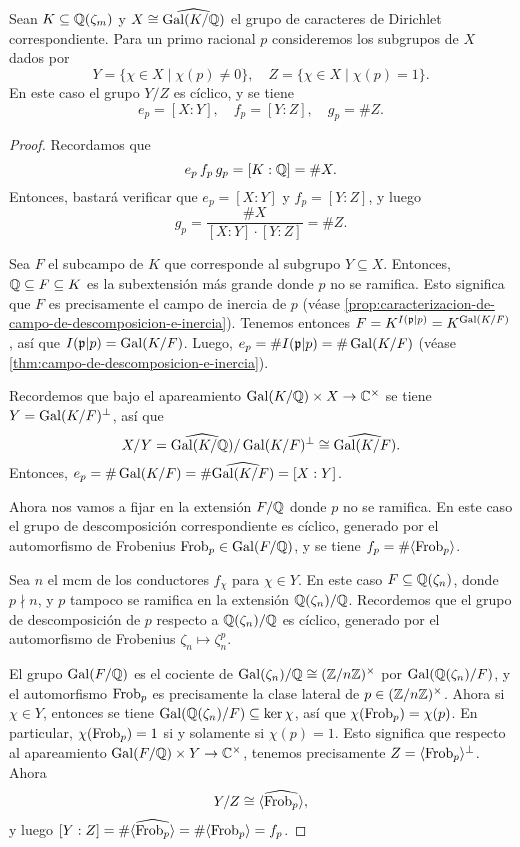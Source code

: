 \begin{teorema}
  \label{thm:caracteres-de-Dirichlet-descomposicion-e-inercia}
  Sean $K \subseteq \mathbb{Q} (\zeta_m)$ y $X \cong \widehat{\operatorname{Gal} (K/\mathbb{Q})}$ el grupo
  de caracteres de Dirichlet correspondiente. Para un primo racional $p$
  consideremos los subgrupos de $X$ dados por
  \[ Y = \{ \chi\in X \mid \chi (p) \ne 0 \}, \quad
     Z = \{ \chi\in X\mid \chi (p) = 1 \}. \]
  En este caso el grupo $Y/Z$ es cíclico, y se tiene
  \[ e_p = [X:Y], \quad
     f_p = [Y:Z], \quad
     g_p = \# Z. \]
  \begin{proof}
    Recordamos que
    $$e_p\,f_p\,g_p = [K : \mathbb{Q}] = \# X.$$
    Entonces, bastará verificar que $e_p = [X:Y]$ y $f_p = [Y:Z]$, y luego
    $$g_p = \frac{\# X}{[X:Y]\cdot [Y:Z]} = \# Z.$$

    Sea $F$ el subcampo de $K$ que corresponde al subgrupo
    $Y \subseteq X$. Entonces, $\mathbb{Q} \subseteq F \subseteq K$ es la subextensión
    más grande donde $p$ no se ramifica. Esto significa que $F$ es precisamente
    el campo de inercia de $p$ (véase
    \ref{prop:caracterizacion-de-campo-de-descomposicion-e-inercia}). Tenemos
    entonces $F = K^{I (\mathfrak{p}|p)} = K^{\operatorname{Gal} (K/F)}$, así que
    $I (\mathfrak{p}|p) = \operatorname{Gal} (K/F)$. Luego,
    $e_p = \# I (\mathfrak{p}|p) = \# \operatorname{Gal} (K/F)$ (véase
    \ref{thm:campo-de-descomposicion-e-inercia}).

    Recordemos que bajo el apareamiento $\operatorname{Gal} (K/\mathbb{Q}) \times X \to \mathbb{C}^\times$
    se tiene $Y = \operatorname{Gal} (K/F)^\perp$, así que
    \[ X/Y = \widehat{\operatorname{Gal} (K/\mathbb{Q})}/\operatorname{Gal} (K/F)^\perp \cong \widehat{\operatorname{Gal} (K/F)}. \]
    Entonces, $e_p = \# \operatorname{Gal} (K/F) = \# \widehat{\operatorname{Gal} (K/F)} = [X : Y]$.

    Ahora nos vamos a fijar en la extensión $F/\mathbb{Q}$ donde $p$ no se ramifica.
    En este caso el grupo de descomposición correspondiente es cíclico, generado
    por el automorfismo de Frobenius $\operatorname{Frob}_p \in \operatorname{Gal} (F/\mathbb{Q})$, y se tiene
    $f_p = \# \langle \operatorname{Frob}_p\rangle$.

    Sea $n$ el mcm de los conductores $f_\chi$ para $\chi \in Y$. En este caso
    $F \subseteq \mathbb{Q} (\zeta_n)$, donde $p \nmid n$, y $p$ tampoco se
    ramifica en la extensión $\mathbb{Q} (\zeta_n)/\mathbb{Q}$. Recordemos que el grupo de
    descomposición de $p$ respecto a $\mathbb{Q} (\zeta_n)/\mathbb{Q}$ es cíclico, generado
    por el automorfismo de Frobenius $\zeta_n \mapsto \zeta_n^p$.

    El grupo $\operatorname{Gal} (F/\mathbb{Q})$ es el cociente de
    $\operatorname{Gal} (\zeta_n)/\mathbb{Q} \cong (\mathbb{Z}/n\mathbb{Z})^\times$ por
    $\operatorname{Gal} (\mathbb{Q} (\zeta_n)/F)$, y el automorfismo $\operatorname{Frob}_p$ es precisamente
    la clase lateral de $p \in (\mathbb{Z}/n\mathbb{Z})^\times$. Ahora si $\chi \in Y$,
    entonces se tiene $\operatorname{Gal} (\mathbb{Q} (\zeta_n)/F) \subseteq \ker \chi$, así que
    $\chi (\operatorname{Frob}_p) = \chi (p)$. En particular, $\chi (\operatorname{Frob}_p) = 1$ si y
    solamente si $\chi (p) = 1$. Esto significa que respecto al apareamiento
    $\operatorname{Gal} (F/\mathbb{Q}) \times Y \to \mathbb{C}^\times$, tenemos precisamente
    $Z = \langle \operatorname{Frob}_p\rangle^\perp$. Ahora
    $$Y/Z \cong \widehat{\langle\operatorname{Frob}_p\rangle},$$
    y luego
    $[Y:Z] = \#\widehat{\langle\operatorname{Frob}_p\rangle} = \#\langle\operatorname{Frob}_p\rangle = f_p$.
  \end{proof}
\end{teorema}

